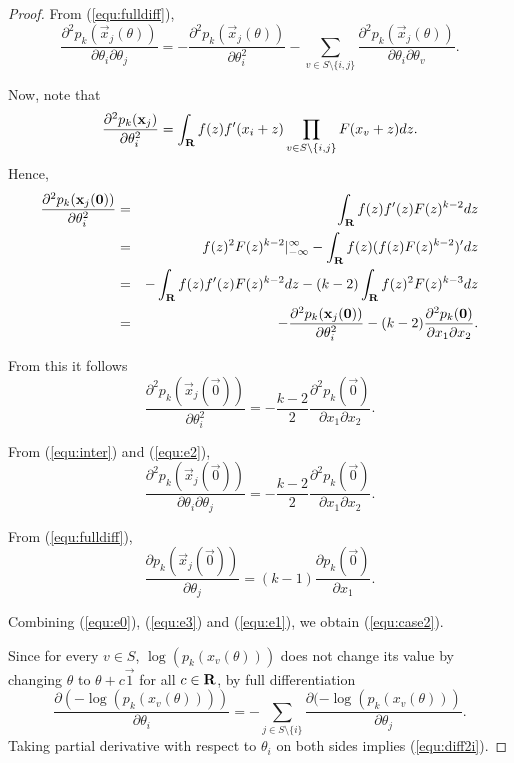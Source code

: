 \begin{proof}
From (\ref{equ:fulldiff}),
\begin{equation}
\frac{\partial^2 p_k(\vec{x}_j(\theta))}{\partial\theta_i \partial \theta_j} = -\frac{\partial^2 p_k(\vec{x}_j(\theta))}{\partial \theta_i^2} - \sum_{v\in S \setminus \{i,j\}} \frac{\partial^2 p_k(\vec{x}_j(\theta))}{\partial \theta_i \partial \theta_v}.
\label{equ:inter}
\end{equation}

Now, note that
$$
\frac{\partial^2 p_k(\mathbf{x}_j)}{\partial \theta_i^2} = \int_{\mathbf{R}} f(z) f'(x_i+z)\prod_{v\in S\setminus \{i,j\}}F(x_v+z)dz.
$$
Hence, 
\begin{eqnarray*}
\frac{\partial^2 p_k(\mathbf{x}_j(\mathbf{0}))}{\partial \theta_i^2}
&=&  \int_{\mathbf{R}} f(z) f'(z) F(z)^{k-2}dz\\
&=& f(z)^2F(z)^{k-2}|_{-\infty}^\infty - \int_{\mathbf{R}} f(z) (f(z)F(z)^{k-2})'dz\\
&=& - \int_{\mathbf{R}} f(z)f'(z)F(z)^{k-2}dz - (k-2) \int_{\mathbf{R}} f(z)^2F(z)^{k-3}dz\\
&=& - \frac{\partial^2 p_k(\mathbf{x}_j(\mathbf{0}))}{\partial \theta_i^2} - (k-2) \frac{\partial^2 p_k(\mathbf{0})}{\partial x_1 \partial x_2}.
\end{eqnarray*}

From this it follows
\begin{equation}
\frac{\partial^2 p_k(\vec{x}_j(\vec{0}))}{\partial \theta_i^2} = -\frac{k-2}{2}\frac{\partial^2 p_k(\vec{0})}{\partial x_1 \partial x_2}.
\label{equ:e2}
\end{equation}

From (\ref{equ:inter}) and (\ref{equ:e2}), 
\begin{equation}
\frac{\partial^2 p_k(\vec{x}_j(\vec{0}))}{\partial\theta_i \partial \theta_j} = -\frac{k-2}{2}\frac{\partial^2 p_k(\vec{0})}{\partial x_1\partial x_2}.
\label{equ:e3}
\end{equation}

From (\ref{equ:fulldiff}),
\begin{equation}
\frac{\partial p_k(\vec{x}_j(\vec{0}))}{\partial \theta_j} = (k-1)\frac{\partial p_k(\vec{0})}{\partial x_1}.
\label{equ:e1}
\end{equation}

Combining (\ref{equ:e0}), (\ref{equ:e3}) and (\ref{equ:e1}), we obtain (\ref{equ:case2}).

Since for every $v\in S$,  $\log(p_k(x_v(\theta)))$ does not change its value by changing $\theta$ to $\theta + c\vec{1}$ for all $c\in \mathbf{R}$, by full differentiation
$$
\frac{\partial (-\log(p_k(x_v(\theta))))}{\partial \theta_i} = -\sum_{j\in S\setminus \{i\}}\frac{\partial (-\log(p_k(x_v(\theta)))}{\partial \theta_j}.
$$
Taking partial derivative with respect to $\theta_i$ on both sides implies (\ref{equ:diff2i}).
\end{proof}

